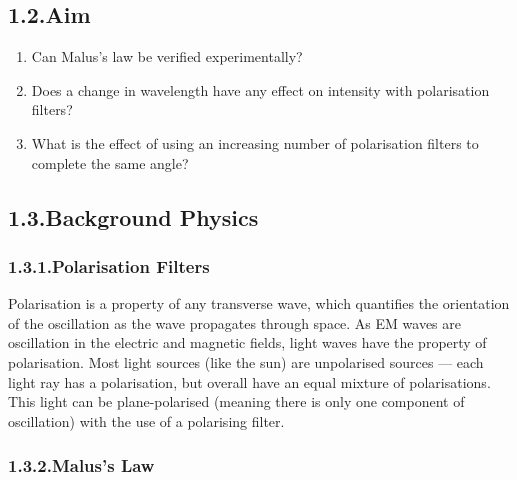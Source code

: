 \documentclass{article}
\begin{document}
\subsection{1.2.\hspace*{0.5em}Aim}\label{sec-aim}%

\begin{enumerate}[noitemsep,topsep=\mdcompacttopsep]%

\item{}Can Malus’s law be verified experimentally?%

\item{}Does a change in wavelength have any effect on intensity with polarisation filters?%

\item{}What is the effect of using an increasing number of polarisation filters to complete the same angle?%
\end{enumerate}%

\subsection{1.3.\hspace*{0.5em}Background Physics}\label{sec-background-physics}%

\subsubsection{1.3.1.\hspace*{0.5em}Polarisation Filters}\label{sec-polarisation-filters}%

\noindent{}Polarisation is a property of any transverse wave, which quantifies the orientation of the oscillation as the wave propagates through space. As EM waves are oscillation in the electric and magnetic fields, light waves have the property of polarisation. Most light sources (like the sun) are unpolarised sources — each light ray has a polarisation, but overall have an equal mixture of polarisations. This light can be plane-polarised (meaning there is only one component of oscillation) with the use of a polarising filter.%

\subsubsection{1.3.2.\hspace*{0.5em}Malus’s Law}\label{sec-maluss-law}%
\end{document}
